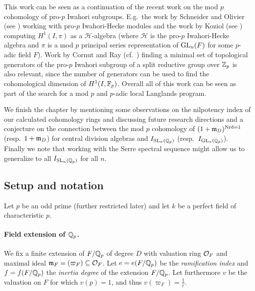 This work can be seen as a continuation of the recent work on the mod $p$ cohomology of pro-$p$ Iwahori subgroups. E.g.\ the work by Schneider and Olivier (see \cite{SchOll-modular,SchOll-torsion,Sch-smooth}) working with pro-$p$ Iwahori-Hecke modules and the work by Koziol (see \cite{Koziol}) computing $H^{1}(I,\pi)$ as a $\mathcal{H}$-algebra (where $\mathcal{H}$ is the pro-$p$ Iwahori-Hecke algebra and $\pi$ is a mod $p$ principal series representation of $\operatorname{GL}_{n}(F)$ for some $p$-adic field $F$). Work by Cornut and Ray (cf.\ \cite{Generators}) finding a minimal set of topological generators of the pro-$p$ Iwahori subgroup of a split reductive group over $\mathbb{Z}_{p}$ is also relevant, since the number of generators can be used to find the cohomological dimension of $H^{1}(I,\mathbb{F}_{p})$. Overall all of this work can be seen as part of the search for a mod $p$ and $p$-adic local Langlands program.

We finish the chapter by mentioning some observations on the nilpotency index of our calculated cohomology rings and discussing future research directions and a conjecture on the connection between the mod $p$ cohomology of $(1+\mathfrak{m}_{D})^{\operatorname{Nrd} = 1}$ (resp.\ $1+\mathfrak{m}_{D}$) for central division algebras and $I_{\operatorname{SL}_{n}(\mathbb{Q}_{p})}$ (resp.\ $I_{\operatorname{GL}_{n}(\mathbb{Q}_{p})}$). Finally we note that working with the Serre spectral sequence might allow us to generalize to all $I_{\operatorname{SL}_{n}(\mathbb{Q}_{p})}$ for all $n$.


\subsection{Setup and notation}%
\label{subsec:setup-iwa}

Let $p$ be an odd prime (further restricted later) and let $k$ be a perfect field of characteristic $p$.

\paragraph{Field extension of $\mathbb{Q}_{p}$.} We fix a finite extension of $F/\mathbb{Q}_{p}$ of degree $D$ with valuation ring $\mathcal{O}_{F}$ and maximal ideal $\mathfrak{m}_{F} = (\varpi_{F}) \subseteq \mathcal{O}_{F}$. Let $e = e(F/\mathbb{Q}_{p})$ be the \emph{ramification index} and $f = f(F/\mathbb{Q}_{p})$ the \emph{inertia degree} of the extension $F/\mathbb{Q}_{p}$. Let furthermore $v$ be the valuation on $F$ for which $v(p) = 1$, and thus $v(\varpi_{F}) = \frac{1}{e}$.

